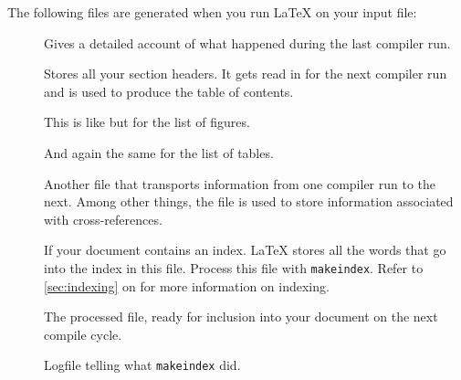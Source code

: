 The following files are generated when you run \LaTeX{} on your input
file:
\begin{description}
  \item[] Gives a detailed account of what happened during the
    last compiler run.
  \item[] Stores all your section headers. It gets read in for the
    next compiler run and is used to produce the table of contents.
  \item[] This is like  but for the list of figures.
  \item[] And again the same for the list of tables.
  \item[] Another file that transports information from one
    compiler run to the next. Among other things, the  file is used
    to store information associated with cross-references.
  \item[] If your document contains an index. \LaTeX{} stores all
    the words that go into the index in this file. Process this file with
    \texttt{makeindex}. Refer to \autoref{sec:indexing} on
     for more information on indexing.
  \item[] The processed  file, ready for inclusion into your
    document on the next compile cycle.
  \item[] Logfile telling what \texttt{makeindex} did.
\end{description}
